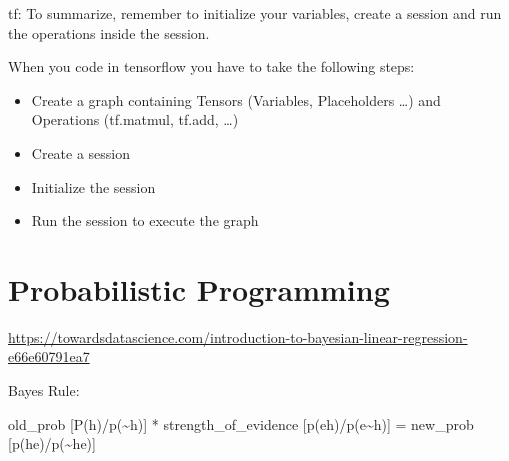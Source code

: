 \documentclass[]{book}
\begin{document}
tf: To summarize, remember to initialize your variables, create a
session and run the operations inside the session.

When you code in tensorflow you have to take the following steps:

\begin{itemize}
\item
  Create a graph containing Tensors (Variables, Placeholders \ldots{})
  and Operations (tf.matmul, tf.add, \ldots{})
\item
  Create a session
\item
  Initialize the session
\item
  Run the session to execute the graph
\end{itemize}

\chapter{Probabilistic Programming}\label{probabilistic-programming}

\url{https://towardsdatascience.com/introduction-to-bayesian-linear-regression-e66e60791ea7}

Bayes Rule:

old\_prob {[}P(h)/p(\textasciitilde{}h){]} * strength\_of\_evidence
{[}p(e\textbar{}h)/p(e\textbar{}\textasciitilde{}h){]} = new\_prob
{[}p(h\textbar{}e)/p(\textasciitilde{}h\textbar{}e){]}
\end{document}
